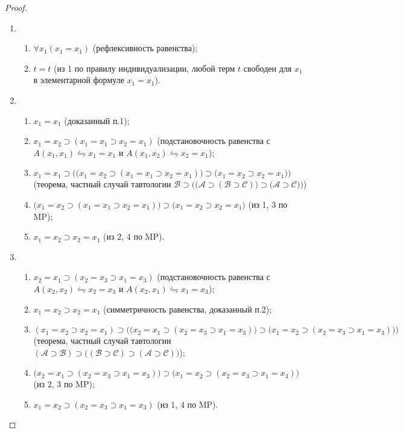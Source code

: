 \begin{proof}\leavevmode
    \begin{enumerate}[label=\arabic*)]
        \item
        \begin{enumerate}[label=\arabic*.]
            \item $\forall x_1(x_1 = x_1)$ (рефлексивность равенства);
            \item $t = t$ (из 1 по правилу индивидуализации, любой терм $t$ свободен для $x_1$ в элементарной формуле $x_1 = x_1$).
        \end{enumerate}

        \item
        \begin{enumerate}[label=\arabic*.]
            \item $x_1 = x_1$ (доказанный п.1);
            \item $x_1 = x_2 \supset (x_1 = x_1 \supset x_2 = x_1)$ (подстановочность равенства с $A(x_1, x_1) \leftrightharpoons x_1 = x_1$ и $A(x_1, x_2) \leftrightharpoons x_2 = x_1$);
            \item $x_1 = x_1 \supset \Big(\big(x_1 = x_2 \supset (x_1 = x_1 \supset x_2 = x_1)\big) \supset \big(x_1 = x_2 \supset x_2 = x_1\big)\Big)$ (теорема, частный случай тавтологии $\mathcal{B} \supset \Big(\big(\mathcal{A} \supset (\mathcal{B} \supset \mathcal{C})\big) \supset \big(\mathcal{A} \supset \mathcal{C}\big)\Big)$)
            \item $\big(x_1 = x_2 \supset (x_1 = x_1 \supset x_2 = x_1)\big) \supset \big(x_1 = x_2 \supset x_2 = x_1\big)$ (из 1, 3 по MP);
            \item $x_1 = x_2 \supset x_2 = x_1$ (из 2, 4 по MP).
        \end{enumerate}

        \item 
        \begin{enumerate}[label=\arabic*.]
            \item $x_2 = x_1 \supset (x_2 = x_3 \supset x_1 = x_3)$ (подстановочность равенства с $A(x_2, x_2) \leftrightharpoons x_2 = x_3$ и $A(x_2, x_1) \leftrightharpoons x_1 = x_3$);
            \item $x_1 = x_2 \supset x_2 = x_1$ (симметричность равенства, доказанный п.2);
            \item $(x_1 = x_2 \supset x_2 = x_1) \supset \Big(\big(x_2 = x_1 \supset (x_2 = x_3 \supset x_1 = x_3)\big) \supset \big(x_1 = x_2 \supset (x_2 = x_3 \supset x_1 = x_3)\big)\Big)$ (теорема, частный случай тавтологии $(\mathcal{A} \supset \mathcal{B}) \supset \big((\mathcal{B} \supset \mathcal{C}) \supset (\mathcal{A} \supset \mathcal{C})\big)$);
            \item $\big(x_2 = x_1 \supset (x_2 = x_3 \supset x_1 = x_3)\big) \supset \big(x_1 = x_2 \supset (x_2 = x_3 \supset x_1 = x_3)\big)$ (из 2, 3 по MP);
            \item $x_1 = x_2 \supset (x_2 = x_3 \supset x_1 = x_3)$ (из 1, 4 по MP).
        \end{enumerate}
    \end{enumerate}
\end{proof}
